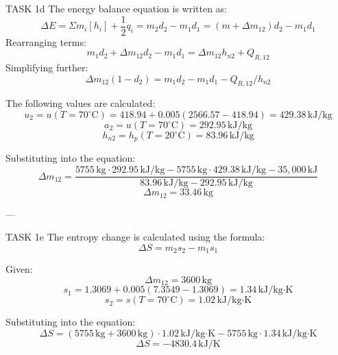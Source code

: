 TASK 1d  
The energy balance equation is written as:  
\[
\Delta E = \Sigma m_i [h_i] + \frac{1}{2} q_i = m_2 d_2 - m_1 d_1 = (m + \Delta m_{12}) d_2 - m_1 d_1
\]  
Rearranging terms:  
\[
m_1 d_2 + \Delta m_{12} d_2 - m_1 d_1 = \Delta m_{12} h_{n2} + Q_{R,12}
\]  
Simplifying further:  
\[
\Delta m_{12} (1 - d_2) = m_1 d_2 - m_1 d_1 - Q_{R,12} / h_{n2}
\]  

The following values are calculated:  
\[
u_2 = u(T=70^\circ\text{C}) = 418.94 + 0.005 (2566.57 - 418.94) = 429.38 \, \text{kJ/kg}
\]  
\[
a_2 = u(T=70^\circ\text{C}) = 292.95 \, \text{kJ/kg}
\]  
\[
h_{n2} = h_p(T=20^\circ\text{C}) = 83.96 \, \text{kJ/kg}
\]  

Substituting into the equation:  
\[
\Delta m_{12} = \frac{5755 \, \text{kg} \cdot 292.95 \, \text{kJ/kg} - 5755 \, \text{kg} \cdot 429.38 \, \text{kJ/kg} - 35,000 \, \text{kJ}}{83.96 \, \text{kJ/kg} - 292.95 \, \text{kJ/kg}}
\]  
\[
\Delta m_{12} = 33.46 \, \text{kg}
\]  

---

TASK 1e  
The entropy change is calculated using the formula:  
\[
\Delta S = m_2 s_2 - m_1 s_1
\]  

Given:  
\[
\Delta m_{12} = 3600 \, \text{kg}
\]  
\[
s_1 = 1.3069 + 0.005 (7.3549 - 1.3069) = 1.34 \, \text{kJ/kg·K}
\]  
\[
s_2 = s(T=70^\circ\text{C}) = 1.02 \, \text{kJ/kg·K}
\]  

Substituting into the equation:  
\[
\Delta S = (5755 \, \text{kg} + 3600 \, \text{kg}) \cdot 1.02 \, \text{kJ/kg·K} - 5755 \, \text{kg} \cdot 1.34 \, \text{kJ/kg·K}
\]  
\[
\Delta S = -4830.4 \, \text{kJ/K}
\]